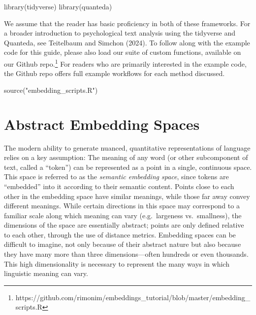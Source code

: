 \documentclass[
  man,
  floatsintext,
  longtable,
  nolmodern,
  notxfonts,
  notimes,
  colorlinks=true,linkcolor=blue,citecolor=blue,urlcolor=blue]{apa7}
\newenvironment{Shaded}{\begin{snugshade}}{\end{snugshade}}
\newcommand{\FunctionTok}[1]{\textcolor[rgb]{0.28,0.35,0.67}{#1}}
\newcommand{\NormalTok}[1]{\textcolor[rgb]{0.00,0.23,0.31}{#1}}
\newcommand{\StringTok}[1]{\textcolor[rgb]{0.13,0.47,0.30}{#1}}
\begin{document}
\begin{Shaded}
\begin{Highlighting}[]
\FunctionTok{library}\NormalTok{(tidyverse)}
\FunctionTok{library}\NormalTok{(quanteda)}
\end{Highlighting}
\end{Shaded}

We assume that the reader has basic proficiency in both of these
frameworks. For a broader introduction to psychological text analysis
using the tidyverse and Quanteda, see Teitelbaum and Simchon (2024). To
follow along with the example code for this guide, please also load our
suite of custom functions, available on our Github repo.\footnote{https://github.com/rimonim/embeddings\_tutorial/blob/master/embedding\_scripts.R}
For readers who are primarily interested in the example code, the Github
repo offers full example workflows for each method discussed.

\begin{Shaded}
\begin{Highlighting}[]
\FunctionTok{source}\NormalTok{(}\StringTok{"embedding\_scripts.R"}\NormalTok{)}
\end{Highlighting}
\end{Shaded}

\section{Abstract Embedding Spaces}\label{abstract-embedding-spaces}

The modern ability to generate nuanced, quantitative representations of
language relies on a key assumption: The meaning of any word (or other
subcomponent of text, called a ``token'') can be represented as a point
in a single, continuous space. This space is referred to as the
\emph{semantic embedding space}, since tokens are ``embedded'' into it
according to their semantic content. Points close to each other in the
embedding space have similar meanings, while those far away convey
different meanings. While certain directions in this space may
correspond to a familiar scale along which meaning can vary
(e.g.~largeness vs.~smallness), the dimensions of the space are
essentially abstract; points are only defined relative to each other,
through the use of distance metrics. Embedding spaces can be difficult
to imagine, not only because of their abstract nature but also because
they have many more than three dimensions---often hundreds or even
thousands. This high dimensionality is necessary to represent the many
ways in which linguistic meaning can vary.
\end{document}
